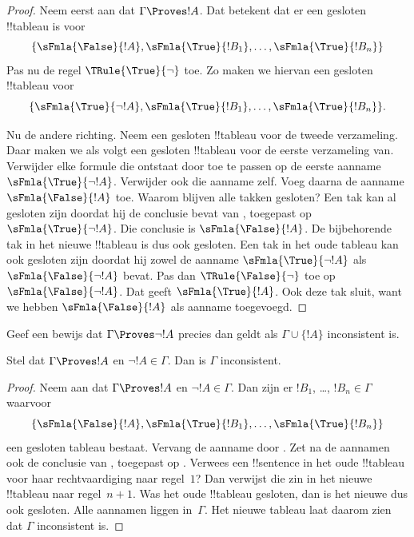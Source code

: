 \documentclass[openany]{memoir}
\begin{document}
\begin{proof}
Neem eerst aan dat $\Gamma \Proves !A$. Dat betekent dat er een
gesloten !!{tableau} is voor
\[
\{\sFmla{\False}{!A},
\sFmla{\True}{!B_1}, \dots, \sFmla{\True}{!B_n}\}
\]
Pas nu de regel $\TRule{\True}{\lnot}$ toe. Zo maken we hiervan een
gesloten !!{tableau} voor
\[
\{\sFmla{\True}{\lnot !A},
\sFmla{\True}{!B_1}, \dots, \sFmla{\True}{!B_n}\}.
\]

Nu de andere richting. Neem een gesloten !!{tableau} voor de tweede
verzameling. Daar maken we als volgt een gesloten !!{tableau} voor de
eerste verzameling van. Verwijder elke formule die ontstaat door
\TRule{\True}{\lnot} toe te passen op de eerste aanname
$\sFmla{\True}{\lnot !A}$. Verwijder ook die aanname zelf. Voeg daarna
de aanname $\sFmla{\False}{!A}$ toe.
Waarom blijven alle takken gesloten? Een tak kan al gesloten zijn
doordat hij de conclusie bevat van \TRule{\True}{\lnot}, toegepast op
$\sFmla{\True}{\lnot !A}$. Die conclusie is
$\sFmla{\False}{!A}$. De bijbehorende tak in het nieuwe !!{tableau} is
dus ook gesloten. Een tak in het oude tableau kan ook gesloten zijn
doordat hij zowel de aanname $\sFmla{\True}{\lnot !A}$ als
$\sFmla{\False}{\lnot !A}$ bevat. Pas dan
$\TRule{\False}{\lnot}$ toe op $\sFmla{\False}{\lnot !A}$. Dat geeft
$\sFmla{\True}{!A}$. Ook deze tak sluit, want we hebben
$\sFmla{\False}{!A}$ als aanname toegevoegd.
\end{proof}

\begin{prob}
Geef een bewijs dat $\Gamma \Proves \lnot !A$ precies dan geldt als
$\Gamma \cup \{!A\}$ inconsistent is.
\end{prob}

\begin{prop}
  Stel dat $\Gamma \Proves !A$ en $\lnot !A \in \Gamma$. Dan is
  $\Gamma$ inconsistent.
\end{prop}

\begin{proof}
  Neem aan dat $\Gamma \Proves !A$ en $\lnot !A \in \Gamma$. Dan zijn
  er $!B_1$, \dots, $!B_n \in \Gamma$ waarvoor \
  \[
  \{\sFmla{\False}{!A}, \sFmla{\True}{!B_1}, \dots, \sFmla{\True}{!B_n}\}
  \]
  een gesloten tableau bestaat. Vervang de aanname
   door . Zet na de aannamen
  ook de conclusie van \TRule{\True}{\lnot}, toegepast op
  . Verwees een !!{sentence} in het oude
  !!{tableau} voor haar rechtvaardiging naar regel~$1$? Dan verwijst
  die zin in het nieuwe !!{tableau} naar regel~$n+1$. Was het oude
  !!{tableau} gesloten, dan is het nieuwe dus ook gesloten. Alle
  aannamen liggen in~$\Gamma$. Het nieuwe tableau laat daarom zien dat
  $\Gamma$ inconsistent is.
\end{proof}
\end{document}
